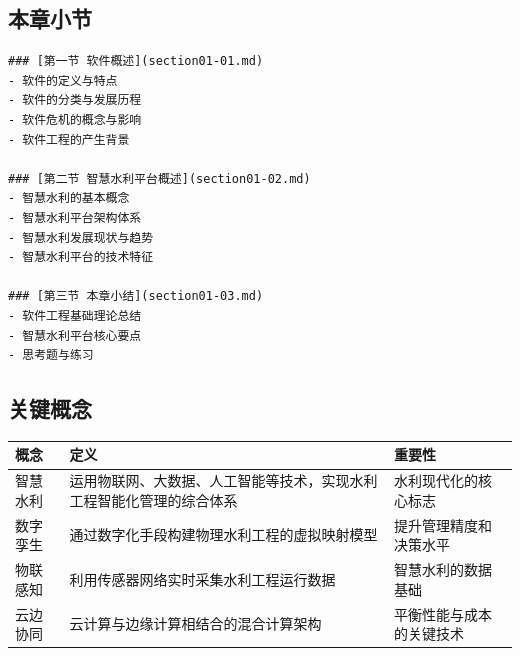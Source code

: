 \documentclass[UTF8,12pt,a4paper,oneside]{ctexbook}
\begin{document}
\subsection{本章小节}\label{ux672cux7ae0ux5c0fux8282}

\begin{infobox}[章节结构]

\end{infobox}

\begin{verbatim}
### [第一节 软件概述](section01-01.md)
- 软件的定义与特点
- 软件的分类与发展历程
- 软件危机的概念与影响
- 软件工程的产生背景

### [第二节 智慧水利平台概述](section01-02.md)
- 智慧水利的基本概念
- 智慧水利平台架构体系
- 智慧水利发展现状与趋势
- 智慧水利平台的技术特征

### [第三节 本章小结](section01-03.md)
- 软件工程基础理论总结
- 智慧水利平台核心要点
- 思考题与练习
\end{verbatim}

\subsection{关键概念}\label{ux5173ux952eux6982ux5ff5}

\begin{longtable}[]{@{}
  >{\raggedright\arraybackslash}p{}
  >{\raggedright\arraybackslash}p{}
  >{\raggedright\arraybackslash}p{}@{}}
\toprule\noalign{}
\begin{minipage}[b]{\linewidth}\raggedright
概念
\end{minipage} & \begin{minipage}[b]{\linewidth}\raggedright
定义
\end{minipage} & \begin{minipage}[b]{\linewidth}\raggedright
重要性
\end{minipage} \\
\midrule\noalign{}
\endhead
\bottomrule\noalign{}
\endlastfoot
智慧水利 &
运用物联网、大数据、人工智能等技术，实现水利工程智能化管理的综合体系 &
水利现代化的核心标志 \\
数字孪生 & 通过数字化手段构建物理水利工程的虚拟映射模型 &
提升管理精度和决策水平 \\
物联感知 & 利用传感器网络实时采集水利工程运行数据 &
智慧水利的数据基础 \\
云边协同 & 云计算与边缘计算相结合的混合计算架构 &
平衡性能与成本的关键技术 \\
\end{longtable}
\end{document}
